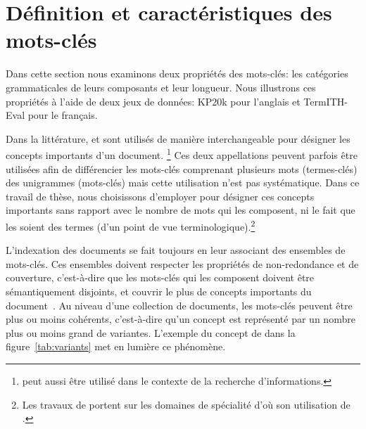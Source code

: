 
\section{Définition et caractéristiques des mots-clés} \label{sec:caracterisation_keywords}

Dans cette section nous examinons deux propriétés des mots-clés: les catégories grammaticales de leurs composants et leur longueur. Nous illustrons ces propriétés à l'aide de deux jeux de données: KP20k pour l'anglais et TermITH-Eval pour le français.

Dans la littérature,  et  sont utilisés de manière interchangeable pour désigner les concepts importants d'un document.
\footnote{ peut aussi être utilisé dans le contexte de la recherche d'informations.}
Ces deux appellations peuvent parfois être utilisées afin de différencier les mots-clés comprenant plusieurs mots (termes-clés) des unigrammes (mots-clés) mais cette utilisation n'est pas systématique.
Dans ce travail de thèse, nous choisissons d'employer  pour désigner ces concepts importants sans rapport avec le nombre de mots qui les composent, ni le fait que les  soient des termes (d'un point de vue terminologique).\footnote{Les travaux de \cite{bougouin_indexation_2015} portent sur les domaines de spécialité d'où son utilisation de .}

L'indexation des documents se fait toujours en leur associant des ensembles de mots-clés. Ces ensembles doivent respecter les propriétés de non-redondance et de couverture, c'est-à-dire que les mots-clés qui les composent doivent être sémantiquement disjoints, et couvrir le plus de concepts importants du document~\cite{firoozeh_keyword_2020}.
Au niveau d'une collection de documents, les mots-clés peuvent être plus ou moins cohérents, c'est-à-dire qu'un concept est représenté par un nombre plus ou moins grand de variantes. L'exemple du concept de  dans la figure~\ref{tab:variants} met en lumière ce phénomène.

